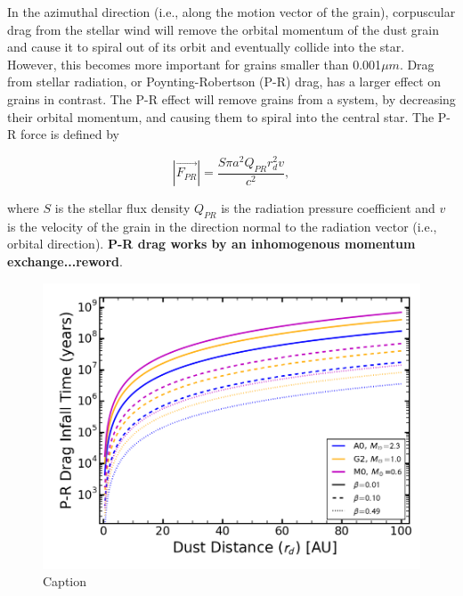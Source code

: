     In the azimuthal direction (i.e., along the motion vector of the grain), corpuscular drag from the stellar wind will remove the orbital momentum of the dust grain and cause it to spiral out of its orbit and eventually collide into the star. However, this becomes more important for grains smaller than 0.001$\mu m$. Drag from stellar radiation, or Poynting-Robertson (P-R) drag, has a larger effect on grains in contrast. The P-R effect will remove grains from a system, by decreasing their orbital momentum, and causing them to spiral into the central star. The P-R force is defined by
    
    \begin{equation}\label{eq:pr_drag}
    |\vec{F_{PR}}| = \frac{S\pi a^2 Q_{PR}r_d^2 v}{c^2},
    \end{equation}
    
    \noindent where $S$ is the stellar flux density $Q_{PR}$ is the radiation pressure coefficient and $v$ is the velocity of the grain in the direction normal to the radiation vector (i.e., orbital direction)\citep{Burns1979}. \textbf{P-R drag works by an inhomogenous momentum exchange...reword}.
    
    \begin{figure}
    \centering
    \includegraphics[scale=0.7]{Ch1/PR_Drag_time} 
    \caption{Caption}
    \label{fig:PR_Drag_time}
    \end{figure}
    
